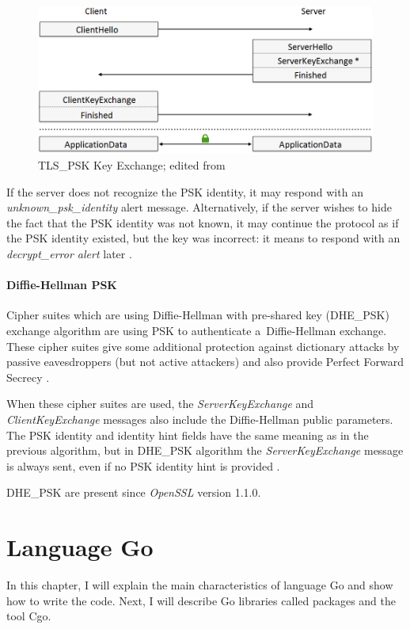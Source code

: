 \documentclass[
  12pt, 
  digital, %
  notable,   %
  nolof,     %
  nolot,     %
]{fithesis3}
\begin{document}
\begin{figure}[th]
	\centering
  	\includegraphics[width=1.05\textwidth]{psk-edited}%
   \caption{TLS\_PSK Key Exchange; edited from \cite{taubert}}
   \label{fig:psk}
\end{figure}

If the server does not recognize the PSK identity, it may respond with an \textit{unknown\_psk\_identity} 
alert message. Alternatively, if the server wishes to hide the fact that the PSK identity was not known, 
it may continue the protocol as if the PSK identity existed, but the key was incorrect: it means to 
respond with an \textit{decrypt\_error alert} later \cite{eronen2005pre}. 

\subsubsection{Diffie-Hellman PSK}
Cipher suites which are using Diffie-Hellman with pre-shared key (DHE\_PSK) exchange algorithm are using 
PSK to authenticate a~Diffie-Hellman exchange. These cipher suites give some additional protection 
against dictionary attacks by passive eavesdroppers (but not active attackers) and also provide Perfect 
Forward Secrecy \cite{pfs}.

When these cipher suites are used, the \textit{ServerKeyExchange} and \textit{ClientKeyExchange} messages 
also include the Diffie-Hellman public parameters. The PSK identity and identity hint fields have the 
same meaning as in the previous algorithm, but in DHE\_PSK algorithm the \textit{ServerKeyExchange} 
message is always sent, even if no PSK identity hint is provided \cite{eronen2005pre}.

DHE\_PSK are present since \textit{OpenSSL} version 1.1.0.

\chapter{Language Go}\label{go}
In this chapter, I will explain the main characteristics of language Go and show how to write the 
code. Next, I will describe Go libraries called packages and the tool Cgo.
\end{document}
